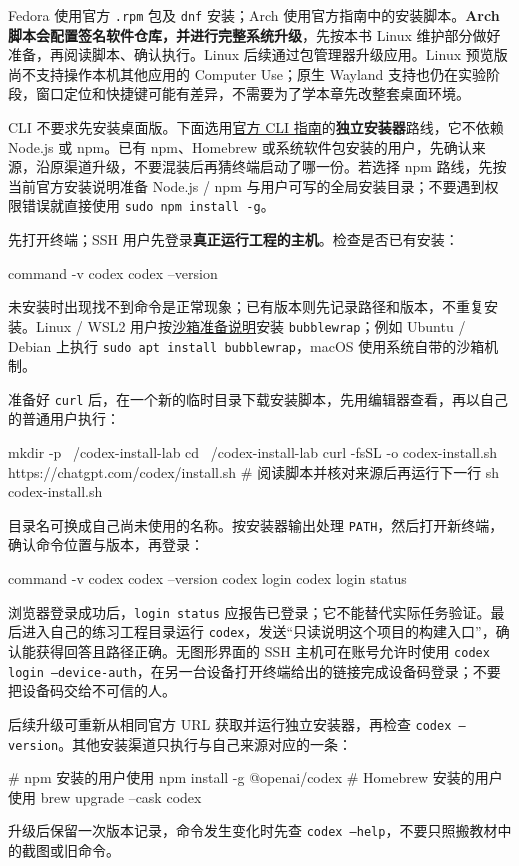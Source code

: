 Fedora 使用官方 \texttt{.rpm} 包及 \texttt{dnf} 安装；Arch 使用官方指南中的安装脚本。\textbf{Arch 脚本会配置签名软件仓库，并进行完整系统升级}，先按本书 Linux 维护部分做好准备，再阅读脚本、确认执行。Linux 后续通过包管理器升级应用。Linux 预览版尚不支持操作本机其他应用的 Computer Use；原生 Wayland 支持也仍在实验阶段，窗口定位和快捷键可能有差异，不需要为了学本章先改整套桌面环境。

CLI 不要求先安装桌面版。下面选用\href{https://learn.chatgpt.com/docs/codex/cli}{官方 CLI 指南}的\textbf{独立安装器}路线，它不依赖 Node.js 或 npm。已有 npm、Homebrew 或系统软件包安装的用户，先确认来源，沿原渠道升级，不要混装后再猜终端启动了哪一份。若选择 npm 路线，先按当前官方安装说明准备 Node.js / npm 与用户可写的全局安装目录；不要遇到权限错误就直接使用 \texttt{sudo npm install -g}。

\begin{example}
先打开终端；SSH 用户先登录\textbf{真正运行工程的主机}。检查是否已有安装：
\begin{tbash}
command -v codex
codex --version
\end{tbash}
未安装时出现找不到命令是正常现象；已有版本则先记录路径和版本，不重复安装。Linux / WSL2 用户按\href{https://learn.chatgpt.com/docs/sandboxing}{沙箱准备说明}安装 \texttt{bubblewrap}；例如 Ubuntu / Debian 上执行 \texttt{sudo apt install bubblewrap}，macOS 使用系统自带的沙箱机制。

准备好 \texttt{curl} 后，在一个新的临时目录下载安装脚本，先用编辑器查看，再以自己的普通用户执行：
\begin{tbash}
mkdir -p ~/codex-install-lab
cd ~/codex-install-lab
curl -fsSL -o codex-install.sh https://chatgpt.com/codex/install.sh
# 阅读脚本并核对来源后再运行下一行
sh codex-install.sh
\end{tbash}
目录名可换成自己尚未使用的名称。按安装器输出处理 \texttt{PATH}，然后打开新终端，确认命令位置与版本，再登录：
\begin{tbash}
command -v codex
codex --version
codex login
codex login status
\end{tbash}
浏览器登录成功后，\texttt{login status} 应报告已登录；它不能替代实际任务验证。最后进入自己的练习工程目录运行 \texttt{codex}，发送“只读说明这个项目的构建入口”，确认能获得回答且路径正确。无图形界面的 SSH 主机可在账号允许时使用 \texttt{codex login --device-auth}，在另一台设备打开终端给出的链接完成设备码登录；不要把设备码交给不可信的人。

后续升级可重新从相同官方 URL 获取并运行独立安装器，再检查 \texttt{codex --version}。其他安装渠道只执行与自己来源对应的一条：
\begin{tbash}
# npm 安装的用户使用
npm install -g @openai/codex
# Homebrew 安装的用户使用
brew upgrade --cask codex
\end{tbash}
升级后保留一次版本记录，命令发生变化时先查 \texttt{codex --help}，不要只照搬教材中的截图或旧命令。
\end{example}

